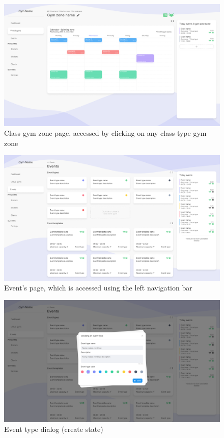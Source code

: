 \documentclass[a4paper, 12pt, oneside]{book}
\begin{document}
\begin{figure}[H]
	\centering
	\includegraphics[width=\textwidth]{assets/ui/ClassGymZone.png}
	\caption{Class gym zone page, accessed by clicking on any class-type gym zone}
\end{figure}
\begin{figure}[H]
	\centering
	\includegraphics[width=\textwidth]{assets/ui/Events.png}
	\caption{Event's page, which is accessed using the left navigation bar}
\end{figure}
\begin{figure}[H]
	\centering
	\includegraphics[width=\textwidth]{assets/ui/EventTypeCreate.png}
	\caption{Event type dialog (create state)}
\end{figure}
\end{document}
